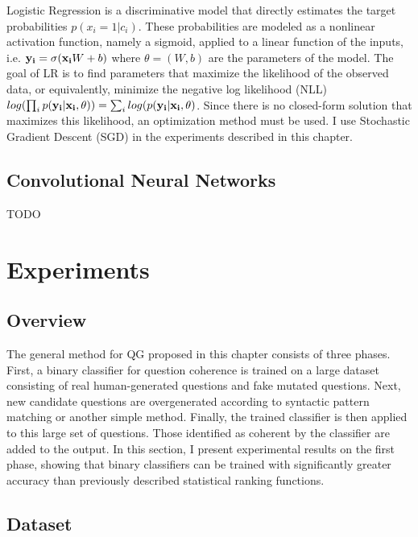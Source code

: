 Logistic Regression is a discriminative model that directly estimates the target probabilities $p(x_i = 1 | c_i)$. These probabilities are modeled as a nonlinear activation function, namely a sigmoid, applied to a linear function of the inputs, i.e. $\bold{y_i} = \sigma(\bold{x_i}W + b)$ where $\theta = (W, b)$ are the parameters of the model. The goal of LR is to find parameters that maximize the likelihood of the observed data, or equivalently, minimize the negative log likelihood (NLL) $log(\prod_i p(\bold{y_i} | \bold{x_i}, \theta)) = \sum_i log(p(\bold{y_i} | \bold{x_i}, \theta)$. Since there is no closed-form solution that maximizes this likelihood, an optimization method must be used. I use Stochastic Gradient Descent (SGD) in the experiments described in this chapter. 

\subsection{Convolutional Neural Networks}

TODO

\section{Experiments}

\subsection{Overview}

The general method for QG proposed in this chapter consists of three phases. First, a binary classifier for question coherence is trained on a large dataset consisting of real human-generated questions and fake mutated questions. Next, new candidate questions are overgenerated according to syntactic pattern matching or another simple method. Finally, the trained classifier is then applied to this large set of questions. Those identified as coherent by the classifier are added to the output. In this section, I present experimental results on the first phase, showing that binary classifiers can be trained with significantly greater accuracy than previously described statistical ranking functions.

\subsection{Dataset}

